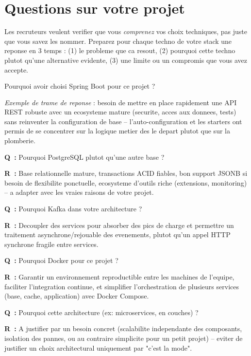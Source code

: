 \documentclass[11pt,a4paper]{article}
\newcommand{\qr}[2]{%
  \par\noindent\textbf{Q~:} #1\par
  \noindent\textbf{R~:} #2\par\smallskip
}
\begin{document}
\newpage
\section{Questions sur votre projet}

\begin{cle}
Les recruteurs veulent verifier que vous \emph{comprenez} vos choix techniques, pas juste que vous savez les nommer. Preparez pour chaque techno de votre stack une reponse en 3 temps : (1) le probleme que ca resout, (2) pourquoi cette techno plutot qu'une alternative evidente, (3) une limite ou un compromis que vous avez accepte.
\end{cle}

\begin{question} Pourquoi avoir choisi Spring Boot pour ce projet ?
\end{question}
\begin{reponse}
\emph{Exemple de trame de reponse} : besoin de mettre en place rapidement une API REST robuste avec un ecosysteme mature (securite, acces aux donnees, tests) sans reinventer la configuration de base -- l'auto-configuration et les starters ont permis de se concentrer sur la logique metier des le depart plutot que sur la plomberie.
\end{reponse}

\qr{Pourquoi PostgreSQL plutot qu'une autre base ?}{Base relationnelle mature, transactions ACID fiables, bon support JSONB si besoin de flexibilite ponctuelle, ecosysteme d'outils riche (extensions, monitoring) -- a adapter avec les vraies raisons de votre projet.}

\qr{Pourquoi Kafka dans votre architecture ?}{Decoupler des services pour absorber des pics de charge et permettre un traitement asynchrone/rejouable des evenements, plutot qu'un appel HTTP synchrone fragile entre services.}

\qr{Pourquoi Docker pour ce projet ?}{Garantir un environnement reproductible entre les machines de l'equipe, faciliter l'integration continue, et simplifier l'orchestration de plusieurs services (base, cache, application) avec Docker Compose.}

\qr{Pourquoi cette architecture (ex: microservices, en couches) ?}{A justifier par un besoin concret (scalabilite independante des composants, isolation des pannes, ou au contraire simplicite pour un petit projet) -- eviter de justifier un choix architectural uniquement par "c'est la mode".}
\end{document}
